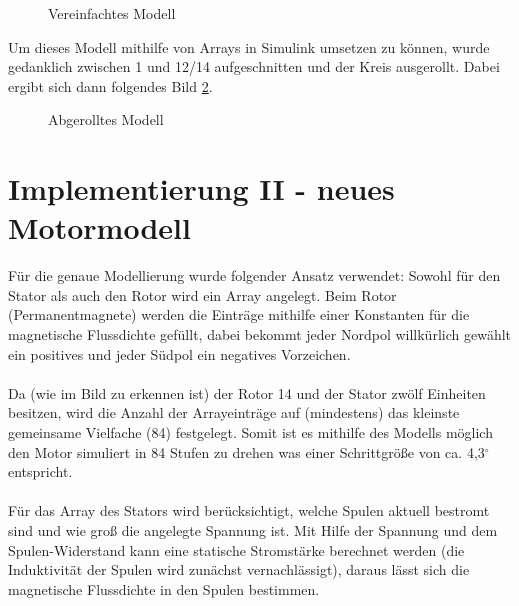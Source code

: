 \begin{figure}[htbp]
	\begin{center}
		
		\caption{Vereinfachtes Modell}
		\label{FigVereinfachtesModell}
	\end{center}
	
\end{figure}


Um dieses Modell mithilfe von Arrays in Simulink umsetzen zu können, wurde gedanklich zwischen 1 und 12/14 aufgeschnitten und der Kreis ausgerollt. Dabei ergibt sich dann folgendes Bild \ref{FigAbgerolltesModell}.


\begin{figure}[htbp]
	\begin{center}
		
		\caption{Abgerolltes Modell}
		\label{FigAbgerolltesModell}
	\end{center}
	
\end{figure}

\section{Implementierung II - neues Motormodell}
Für die genaue Modellierung wurde folgender Ansatz verwendet: Sowohl für den Stator als auch den Rotor wird ein Array angelegt. Beim Rotor (Permanentmagnete) werden die Einträge mithilfe einer Konstanten für die magnetische Flussdichte gefüllt, dabei bekommt jeder Nordpol willkürlich gewählt ein positives und jeder Südpol ein negatives Vorzeichen. 

\paragraph{}
Da (wie im Bild zu erkennen ist) der Rotor 14 und der Stator zwölf Einheiten besitzen, wird die Anzahl der Arrayeinträge auf (mindestens) das kleinste gemeinsame Vielfache (84) festgelegt. Somit ist es mithilfe des Modells möglich den Motor simuliert in 84 Stufen zu drehen was einer Schrittgröße von ca. 4,3$^{\circ}$ entspricht. 

\paragraph{}
Für das Array des Stators wird berücksichtigt, welche Spulen aktuell bestromt sind und wie groß die angelegte Spannung ist. Mit Hilfe der Spannung und dem Spulen-Widerstand kann eine statische Stromstärke berechnet werden (die Induktivität der Spulen wird zunächst vernachlässigt), daraus lässt sich die magnetische Flussdichte in den Spulen bestimmen. 

